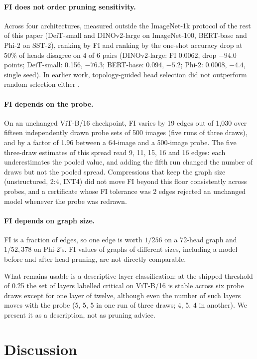 \documentclass[11pt,a4paper]{article}
\begin{document}
\paragraph{FI does not order pruning sensitivity.} Across four architectures, measured outside the ImageNet-1k protocol of the rest of this paper (DeiT-small and DINOv2-large on ImageNet-100, BERT-base and Phi-2 on SST-2), ranking by FI and ranking by the one-shot accuracy drop at 50\% of heads disagree on 4 of 6 pairs (DINOv2-large: FI 0.0062, drop $-94.0$ points; DeiT-small: 0.156, $-76.3$; BERT-base: 0.094, $-5.2$; Phi-2: 0.0008, $-4.4$, single seed). In earlier work, topology-guided head selection did not outperform random selection either \cite{martinventi2026salpreprint}.

\paragraph{FI depends on the probe.} On an unchanged ViT-B/16 checkpoint, FI varies by 19 edges out of 1{,}030 over fifteen independently drawn probe sets of 500 images (five runs of three draws), and by a factor of 1.96 between a 64-image and a 500-image probe. The five three-draw estimates of this spread read 9, 11, 15, 16 and 16 edges: each underestimates the pooled value, and adding the fifth run changed the number of draws but not the pooled spread. Compressions that keep the graph size (unstructured, 2:4, INT4) did not move FI beyond this floor consistently across probes, and a certificate whose FI tolerance was 2 edges rejected an unchanged model whenever the probe was redrawn.

\paragraph{FI depends on graph size.} FI is a fraction of edges, so one edge is worth $1/256$ on a 72-head graph and $1/52{,}378$ on Phi-2's. FI values of graphs of different sizes, including a model before and after head pruning, are not directly comparable.

What remains usable is a descriptive layer classification: at the shipped threshold of 0.25 the set of layers labelled critical on ViT-B/16 is stable across six probe draws except for one layer of twelve, although even the number of such layers moves with the probe (5, 5, 5 in one run of three draws; 4, 5, 4 in another). We present it as a description, not as pruning advice.

\section{Discussion}
\label{sec:discussion}
\end{document}

